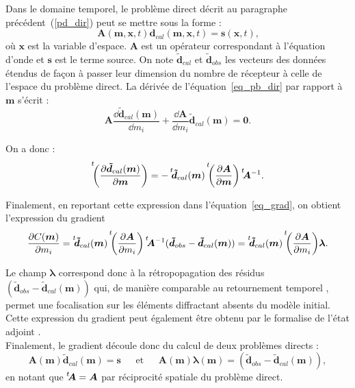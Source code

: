Dans le domaine temporel, le problème direct décrit au paragraphe précédent~(\ref{pd_dir}) peut se mettre sous la forme :
\begin{equation}
	\bm{A}(\bm{m},\bm{x},t)\bm{d}_{cal}(\bm{m},\bm{x},t)=\bm{s}(\bm{x},t)\text{,}
	\label{eq_pb_dir}
\end{equation}
où $\bm{x}$ est la variable d'espace. $\bm{A}$ est un opérateur correspondant à l'équation d'onde et $\bm{s}$ est le terme source. On note $\bm{\tilde{d}}_{cal}$ et $\bm{\tilde{d}}_{obs}$ les vecteurs des données étendus de façon à passer leur dimension du nombre de récepteur à celle de l'espace du problème direct. La dérivée de l'équation~\ref{eq_pb_dir} par rapport à $\bm{m}$ s'écrit : 
\begin{equation}
	\bm{A} \frac{\dd \bm{\tilde{d}}_{cal}(\bm{m})}{\dd m_{i}} + \frac{\dd \bm{A}}{\dd m_{i}}\bm{\tilde{d}}_{cal}(\bm{m}) = \bm{0} \text{.}
\end{equation}

On a donc : 
\begin{equation}
	\tr{\left( \frac{\dd \bm{\tilde{d}}_{cal}(\bm{m})}{\dd \bm{m}}  \right)} = - \tr{\bm{\tilde{d}}_{cal}(\bm{m})} \tr{\left( \frac{\dd \bm{A}}{\dd \bm{m}} \right)} \tr{\bm{A}^{-1}}.
	\label{sub}
\end{equation} 	

Finalement, en reportant cette expression dans l'équation~\ref{eq_grad}, on obtient l'expression du gradient  
\begin{equation}
	 \frac{\dd C (\bm{m})}{\dd m_{i}} = \tr{\bm{\tilde{d}}_{cal}(\bm{m})}  \tr{\left( \frac{\dd \bm{A}}{\dd m_{i}}\right)} \tr{\bm{A}^{-1}} (\bm{\tilde{d}}_{obs} - \bm{\tilde{d}}_{cal}(\bm{m})) = \tr{\bm{\tilde{d}}_{cal}(\bm{m})} \tr{\left( \frac{\dd \bm{A}}{\dd m_{i}}\right)} \bm{\lambda}.
	 \label{fwi:eq_grad2}
\end{equation}


Le champ $\bm{\lambda}$ correspond donc à la rétropopagation des résidus $( \bm{\tilde{d}}_{obs} - \bm{\tilde{d}}_{cal}(\bm{m}))$ qui, de manière comparable au retournement temporel \citep{prada_2002}, permet une focalisation sur les éléments diffractant absents du modèle initial. Cette expression du gradient peut également être obtenu par le formalise de l'état adjoint \citep{plessix}.\\
Finalement, le gradient découle donc du calcul de deux problèmes directs : 
\begin{equation*}
	\bm{A}(\bm{m})\bm{\tilde{d}}_{cal}(\bm{m})=\bm{s} ~~~~~~~\text{et}~~~~~~~\bm{A}(\bm{m})\bm{\lambda} (\bm{m})=( \bm{\tilde{d}}_{obs} - \bm{\tilde{d}}_{cal}(\bm{m})),
\end{equation*}
en notant que $\tr{\bm{A}}=\bm{A}$ par réciprocité spatiale du problème direct.\\


